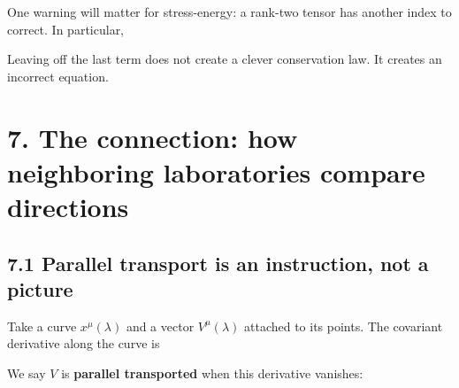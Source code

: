 \documentclass[
  11pt,
  letterpaper,
  oneside,
  openany]{scrbook}
\begin{document}
One warning will matter for stress-energy: a rank-two tensor has another
index to correct. In particular,

\begin{center}
\begingroup
{}
\ifdim\wd\grmathbox>\linewidth
\resizebox{\linewidth}{!}{\usebox{\grmathbox}}
\else\usebox{\grmathbox}\fi
\endgroup
\end{center}

Leaving off the last term does not create a clever conservation law. It
creates an incorrect equation.

\hypertarget{chapter-7}{%
\chapter{7. The connection: how neighboring laboratories compare
directions}\label{chapter-7}}

\hypertarget{parallel-transport-is-an-instruction-not-a-picture}{%
\section{7.1 Parallel transport is an instruction, not a
picture}\label{parallel-transport-is-an-instruction-not-a-picture}}

Take a curve \(x^\mu(\lambda)\) and a vector \(V^\mu(\lambda)\) attached
to its points. The covariant derivative along the curve is

\begin{center}
\begingroup
{}
\ifdim\wd\grmathbox>\linewidth
\resizebox{\linewidth}{!}{\usebox{\grmathbox}}
\else\usebox{\grmathbox}\fi
\endgroup
\end{center}

We say \(V\) is \textbf{parallel transported} when this derivative
vanishes:

\begin{center}
\begingroup
{}
\ifdim\wd\grmathbox>\linewidth
\resizebox{\linewidth}{!}{\usebox{\grmathbox}}
\else\usebox{\grmathbox}\fi
\endgroup
\end{center}
\end{document}
